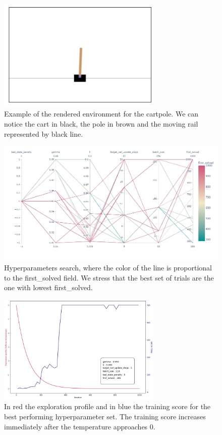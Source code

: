 
\begin{figure}[h]
    \centering
    \includegraphics[width=0.7\textwidth]{Images/CartPole.png}
    \caption{Example of the rendered environment for the cartpole. We can notice the cart in black, the pole in brown and the moving rail represented by 
    black line.}
    \label{fig:Cart}
\end{figure}

\begin{figure}[h]
    \centering
    \includegraphics[width=\textwidth]{Images/CartPoleHyper2.png}
    \caption{Hyperparameters search, where the color of the line is proportional to the first\_solved field. 
        We stress that the best set of trials are the one with lowest first\_solved.}
    \label{fig:hyper}
\end{figure}

\begin{figure}[h]
    \centering
    \includegraphics[width=0.7\textwidth]{Images/Best_set_Cartpole.png}
    \caption{In red the exploration profile and in blue the training score for the best performing hyperparameter set.
        The training score increases immediately after the temperature approaches $0$.}
    \label{fig:best_cart}
\end{figure}

